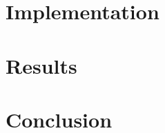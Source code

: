 \documentclass{llncs}
\begin{document}
\section{Implementation}

\section{Results}

\section{Conclusion}

\printbibliography
\end{document}
